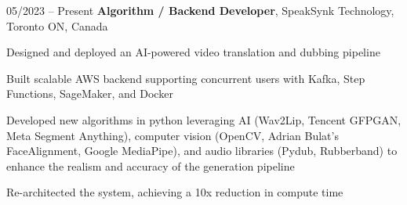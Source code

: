 \begin{twocolentry}{
    05/2023 – Present
}
    \textbf{Algorithm / Backend Developer}, SpeakSynk Technology, Toronto ON, Canada\end{twocolentry}

\vspace{0.10 cm}
\begin{onecolentry}
    \begin{highlights}
        \item Designed and deployed an AI-powered video translation and dubbing pipeline
        \item Built scalable AWS backend supporting concurrent users with Kafka, Step Functions, SageMaker, and Docker
        \item Developed new algorithms in python leveraging AI (Wav2Lip, Tencent GFPGAN, Meta Segment Anything), computer vision (OpenCV, Adrian Bulat’s FaceAlignment, Google MediaPipe), and audio libraries (Pydub, Rubberband) to enhance the realism and accuracy of the generation pipeline 
        \item Re-architected the system, achieving a 10x reduction in compute time
    \end{highlights}
\end{onecolentry}